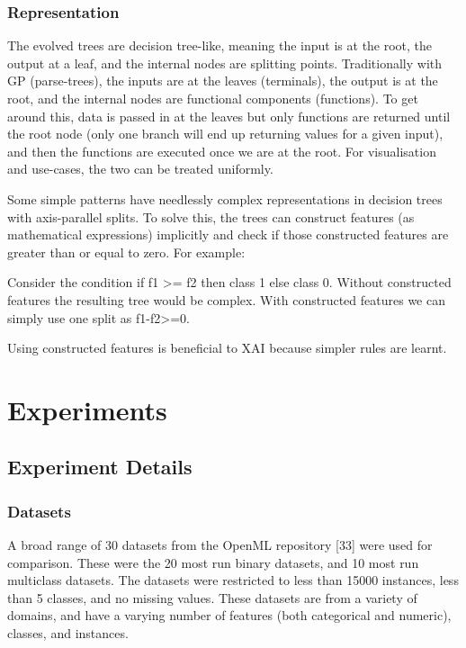 \subsubsection{Representation}
The evolved trees are decision tree-like, meaning the input is at the root, the output at a leaf, and the internal nodes are splitting points. Traditionally with GP (parse-trees), the inputs are at the leaves (terminals), the output is at the root, and the internal nodes are functional components (functions). To get around this, data is passed in at the leaves but only functions are returned until the root node (only one branch will end up returning values for a given input), and then the functions are executed once we are at the root. For visualisation and use-cases, the two can be treated uniformly. 

Some simple patterns have needlessly complex representations in decision trees with axis-parallel splits. To solve this, the trees can construct features (as mathematical expressions) implicitly and check if those constructed features are greater than or equal to zero. For example: 
\begin{center}
Consider the condition if f1 >= f2 then class 1 else class 0. Without constructed features the resulting tree would be complex. With constructed features we can simply use one split as f1-f2>=0.
\end{center}

Using constructed features is beneficial to XAI because simpler rules are learnt.
\section{Experiments}
\subsection{Experiment Details}
\subsubsection{Datasets}
A broad range of 30 datasets from the OpenML repository [33] were used for comparison. These were the 20 most run binary datasets, and 10 most run multiclass datasets. The datasets were restricted to less than 15000 instances, less than 5 classes, and no missing values. These datasets are from a variety of domains, and have a varying number of features (both categorical and numeric), classes, and instances.

